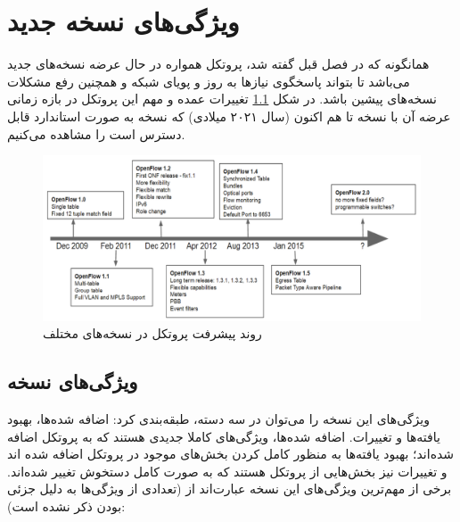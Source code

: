 \chapter{ویژگی‌های نسخه جدید }
همانگونه که در فصل قبل گفته شد، پروتکل  همواره در حال عرضه نسخه‌های جدید می‌باشد تا بتواند پاسخگوی نیاز‌ها به روز و پویای شبکه و همچنین رفع مشکلات نسخه‌های پیشین باشد. در شکل \ref{fig7} تغییرات عمده و مهم این پروتکل در بازه زمانی عرضه آن با نسخه  تا هم اکنون (سال ۲۰۲۱ میلادی) که نسخه  به صورت استاندارد قابل دسترس است را مشاهده می‌کنیم.

\begin{figure}[H]
	\centering
	\includegraphics[scale=0.4]{imgs/of_timeline.png}
	\caption{روند پیشرفت پروتکل در نسخه‌های مختلف \cite{roadmap}}
	\label{fig7}
\end{figure}

\pagebreak

\section{ویژگی‌های نسخه }
ویژگی‌های این نسخه را می‌توان در سه دسته، طبقه‌بندی کرد: اضافه شده‌ها، بهبود یافته‌ها و تغییرات. اضافه شده‌ها، ویژگی‌های کاملا جدیدی هستند که به پروتکل اضافه شده‌اند؛ بهبود یافته‌ها به منظور کامل کردن بخش‌های موجود در پروتکل اضافه شده اند و تغییرات نیز بخش‌هایی از پروتکل هستند که به صورت کامل دستخوش تغییر شده‌اند.
برخی از مهم‌ترین ویژگی‌های این نسخه عبارت‌اند از (تعدادی از ويژگی‌ها به دلیل جزئی بودن ذکر نشده است):

